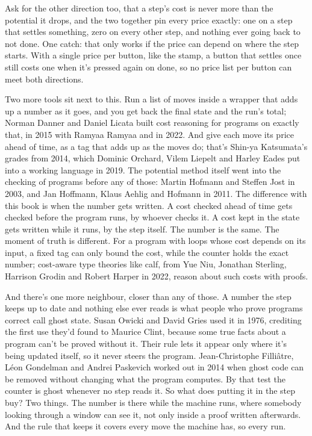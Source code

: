 \documentclass[11pt,twoside]{article}
\theoremstyle{thielethm}
\theoremstyle{thieledef}
\theoremstyle{thieledef}
\theoremstyle{thieledef}
\theoremstyle{thielethm}
\theoremstyle{thieleobs}
\theoremstyle{thielethm}
\begin{document}
Ask for the other direction too, that a step's cost is never more than the potential it drops, and the two together pin every price exactly: one on a step that settles something, zero on every other step, and nothing ever going back to not done. One catch: that only works if the price can depend on where the step starts. With a single price per button, like the stamp, a button that settles once still costs one when it's pressed again on done, so no price list per button can meet both directions.

Two more tools sit next to this. Run a list of moves inside a wrapper that adds up a number as it goes, and you get back the final state and the run's total; Norman Danner and Daniel Licata built cost reasoning for programs on exactly that, in 2015 with Ramyaa Ramyaa and in 2022. And give each move its price ahead of time, as a tag that adds up as the moves do; that's Shin-ya Katsumata's grades from 2014, which Dominic Orchard, Vilem Liepelt and Harley Eades put into a working language in 2019. The potential method itself went into the checking of programs before any of those: Martin Hofmann and Steffen Jost in 2003, and Jan Hoffmann, Klaus Aehlig and Hofmann in 2011. The difference with this book is when the number gets written. A cost checked ahead of time gets checked before the program runs, by whoever checks it. A cost kept in the state gets written while it runs, by the step itself. The number is the same. The moment of truth is different. For a program with loops whose cost depends on its input, a fixed tag can only bound the cost, while the counter holds the exact number; cost-aware type theories like calf, from Yue Niu, Jonathan Sterling, Harrison Grodin and Robert Harper in 2022, reason about such costs with proofs.

And there's one more neighbour, closer than any of those. A number the step keeps up to date and nothing else ever reads is what people who prove programs correct call ghost state. Susan Owicki and David Gries used it in 1976, crediting the first use they'd found to Maurice Clint, because some true facts about a program can't be proved without it. Their rule lets it appear only where it's being updated itself, so it never steers the program. Jean-Christophe Filliâtre, Léon Gondelman and Andrei Paskevich worked out in 2014 when ghost code can be removed without changing what the program computes. By that test the counter is ghost whenever no step reads it. So what does putting it in the step buy? Two things. The number is there while the machine runs, where somebody looking through a window can see it, not only inside a proof written afterwards. And the rule that keeps it covers every move the machine has, so every run.
\end{document}
